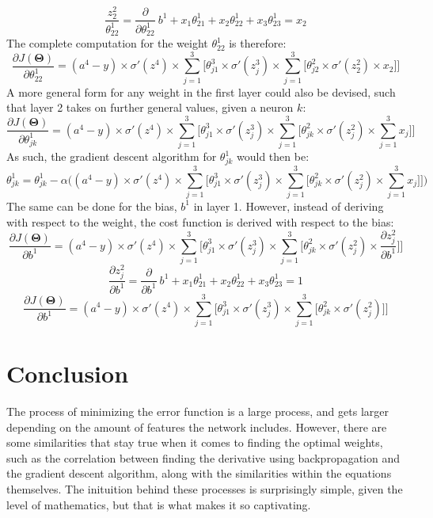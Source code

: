 \documentclass[a4paper,12pt]{article}
\begin{document}
\[\frac{z^2_2}{\theta_{22}^1} = \frac{\partial}{\partial \theta_{22}^1} \ b^1 + x_1\theta_{21}^1 + x_2\theta_{22}^1 + x_3\theta^1_{23} = x_2\]
The complete computation for the weight $\theta_{22}^1$ is therefore: 
\[\frac{\partial J(\boldsymbol{\Theta})}{\partial \theta^1_{22}} = (a^4 - y) \times \sigma'(z^4) \times \sum_{j=1}^3 \Big[\theta^3_{j1} \times \sigma'(z^3_j) \times \sum_{j=1}^{3} \Big[ \theta^2_{j2} \times \sigma'(z^2_2) \times x_2\Big]\Big]\]
A more general form for any weight in the first layer could also be devised, such that layer 2 takes on further general values, given a neuron $k$:
\[\frac{\partial J(\boldsymbol{\Theta})}{\partial \theta^1_{jk}} = (a^4 - y) \times \sigma'(z^4) \times \sum_{j=1}^3 \Big[\theta^3_{j1} \times \sigma'(z^3_j) \times \sum_{j=1}^{3} \Big[ \theta^2_{jk} \times \sigma'(z^2_j) \times \sum_{j=1}^3x_j\Big]\Big]\]
As such, the gradient descent algorithm for $\theta_{jk}^1$ would then be:
\[\theta_{jk}^1 = \theta_{jk}^1 - \alpha\Big((a^4 - y) \times \sigma'(z^4) \times \sum_{j=1}^3 \Big[\theta^3_{j1} \times \sigma'(z^3_j) \times \sum_{j=1}^{3} \Big[ \theta^2_{jk} \times \sigma'(z^2_j) \times \sum_{j=1}^3x_j\Big]\Big]\Big)\]
The same can be done for the bias, $b^1$ in layer 1. However, instead of deriving with respect to the weight, the cost function is derived with respect to the bias:
\[\frac{\partial J(\boldsymbol{\Theta})}{\partial b^1} = (a^4 - y) \times \sigma'(z^4) \times \sum_{j=1}^3 \Big[\theta^3_{j1} \times \sigma'(z^3_j) \times \sum_{j=1}^{3} \Big[ \theta^2_{jk} \times \sigma'(z^2_j) \times \frac{\partial z^2_j}{\partial b^1}\Big]\Big]\]
\[\frac{\partial z^2_j}{\partial b^1} = \frac{\partial}{\partial b^1} \ b^1 + x_1\theta_{21}^1 + x_2\theta_{22}^1 + x_3\theta^1_{23} = 1\]
\[\frac{\partial J(\boldsymbol{\Theta})}{\partial b^1} = (a^4 - y) \times \sigma'(z^4) \times \sum_{j=1}^3 \Big[\theta^3_{j1} \times \sigma'(z^3_j) \times \sum_{j=1}^{3} \Big[ \theta^2_{jk} \times \sigma'(z^2_j)\Big]\Big]\]

\section{Conclusion}
The process of minimizing the error function is a large process, and gets larger depending on the amount of features the network includes. However, there are some similarities that stay true when it comes to finding the optimal weights, such as the correlation between finding the derivative using backpropagation and the gradient descent algorithm, along with the similarities within the equations themselves. The inituition behind these processes is surprisingly simple, given the level of mathematics, but that is what makes it so captivating.
\end{document}

